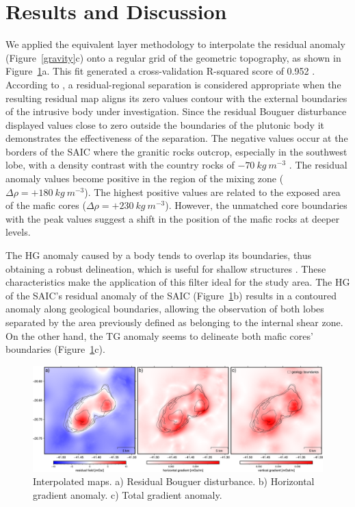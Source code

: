 \section{Results and Discussion}

We applied the equivalent layer methodology to interpolate the residual anomaly (Figure~\ref{gravity}c) onto a regular grid of the geometric topography, as shown in Figure~\ref{final}a. This fit generated a cross-validation R-squared score of 0.952 \citep{Uieda2020}. According to \citet{Vigneresse1990}, a residual-regional separation is considered appropriate when the resulting residual map aligns its zero values contour with the external boundaries of the intrusive body under investigation. Since the residual Bouguer disturbance displayed values close to zero outside the boundaries of the plutonic body it demonstrates the effectiveness of the separation. The negative values occur at the
borders of the SAIC where the granitic rocks outcrop, especially in the southwest
lobe, with a density contrast with the country rocks of $-70~kg~m^{-3}$ \citep{Souza-Junior2021}. The residual anomaly values become positive in the region of the mixing zone ($\Delta \rho = +180~kg~m^{-3}$). The highest positive values are related to the exposed area of the mafic cores ($\Delta \rho = +230~kg~m^{-3}$). However, the unmatched core boundaries with the peak values suggest a shift in the position of the mafic rocks at deeper levels.



The HG anomaly caused by a body tends to overlap its boundaries, thus obtaining a robust delineation, which is useful for shallow structures \citep{Blakely1996}. These characteristics make the application of this filter ideal for the study area. The HG of the SAIC's residual anomaly of the SAIC (Figure~\ref{final}b) results in a contoured anomaly along geological boundaries, allowing the observation of both lobes separated by the area previously defined as belonging to the internal shear zone. On the other hand, the TG anomaly seems to delineate both mafic cores' boundaries (Figure~\ref{final}c).
 
\begin{figure}[H]
  \centering
  \includegraphics[width=1\linewidth]{figures/painel_final.png}
  \caption{
    Interpolated maps. a) Residual Bouguer disturbance. b) Horizontal gradient anomaly. c) Total gradient anomaly.
      }
  \label{final}
\end{figure}
